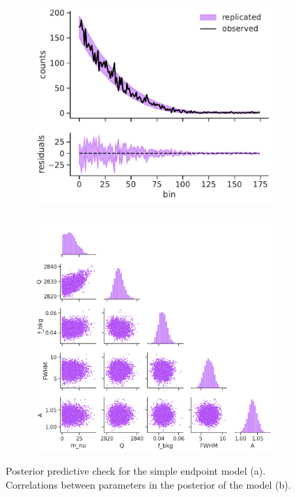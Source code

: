 \begin{figure}[t]
\begin{subfigure}[b]{0.45\linewidth}
    \includegraphics[width=\linewidth]{figures/ch3/endpoint/predictive_check_1.pdf}
\caption{}
\end{subfigure}
\hfill
    \begin{subfigure}[b]{0.54\linewidth}
\includegraphics[width=\linewidth]{figures/ch3/endpoint/pair_grid_0.png}
\caption{}
\end{subfigure}
\caption{Posterior predictive check for the simple endpoint model (a). Correlations between parameters in the posterior of
the model (b).} 
\label{fig:endcorr}
\end{figure}

